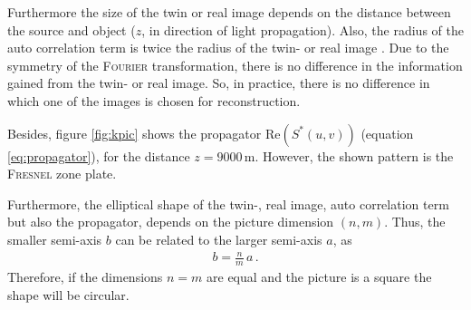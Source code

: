 \documentclass{article}
\begin{document}
Furthermore the size of the twin or real image depends on the distance between the source and object ($z$, in direction of light propagation). Also, the radius of the auto correlation term is twice the radius of the twin- or real image \cite{Verrier:11}. Due to the symmetry of the \textsc{Fourier} transformation, there is no difference in the information gained from the twin- or real image. So, in practice, there is no difference in which one of the images is chosen for reconstruction.

Besides, figure \ref{fig:kpic} shows the propagator $\text{Re}\left(S^*(u,v)\right)$ (equation \ref{eq:propagator}), for the distance $z=9000$\,\textmu m. However, the shown pattern is the \textsc{Fresnel} zone plate. 

Furthermore, the elliptical shape of the twin-, real image, auto correlation term but also the propagator, depends on the picture dimension $(n,m)$. Thus, the smaller semi-axis $b$ can be related to the larger semi-axis $a$, as
\begin{align}
    b=\frac{n}{m}\,a\,. \label{form:ellipse}
\end{align}
Therefore, if the dimensions $n=m$ are equal and the picture is a square the shape will be circular.
\end{document}
